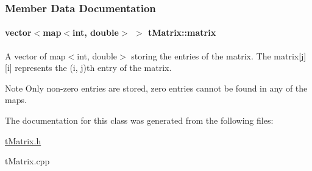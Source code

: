 \subsubsection{Member Data Documentation}
\hypertarget{classt_matrix_a3d962506eec7f8d0f65cb2d50e5b81bc}{
\paragraph[{matrix}]{\setlength{\rightskip}{0pt plus 5cm}vector$<$map$<$int, double$>$ $>$ t\+Matrix\+::matrix\hspace{0.3cm}{\ttfamily [private]}}}\label{classt_matrix_a3d962506eec7f8d0f65cb2d50e5b81bc}
A vector of map$<$int, double$>$ storing the entries of the matrix. The matrix\mbox{[}j\mbox{]}\mbox{[}i\mbox{]} represents the (i, j)th entry of the matrix.

\begin{DoxyNote}{Note}
Only non-\/zero entries are stored, zero entries cannot be found in any of the maps. 
\end{DoxyNote}


The documentation for this class was generated from the following files\+:\begin{DoxyCompactItemize}
\item 
\hyperlink{t_matrix_8h}{t\+Matrix.\+h}\item 
t\+Matrix.\+cpp\end{DoxyCompactItemize}
